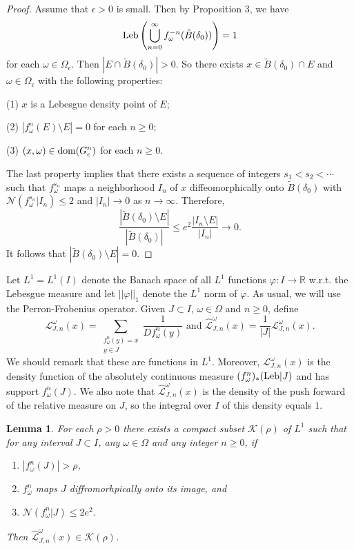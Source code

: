 \documentclass[11pt,oneside]{article}
\theoremstyle{plain}
\newtheorem{lem}{Lemma}[section]
\numberwithin{equation}{section}
\numberwithin{figure}{section}
\numberwithin{table}{section}
\begin{document}
\begin{proof}

Assume that $\epsilon > 0$ is small. Then by Proposition 3, we have
\[
{\rm Leb} \left( \bigcup_{n=0}^{\infty} f_{\omega}^{-n} (\hat B(\delta_0)) \right) =1
\]
for each $\omega \in \Omega_{\epsilon}$. Then $|E \cap \tilde B(\delta_0) | > 0$. So there exists $x \in \tilde B(\delta_0) \cap E$ and $\omega \in \Omega_{\epsilon}$ with the following properties:

(1) $x$ is a Lebesgue density point of $E$;

(2) $|f_{\omega}^n(E) \setminus E| =0$ for each $n \geq 0$;

(3) $(x, \omega) \in {\rm dom} (G_{\epsilon}^n)$ for each $n \geq 0$.

The last property implies that there exists a sequence of integers $s_1 < s_2 < \cdots  $ such that $f_{\omega}^{s_n}$ maps a neighborhood $I_n$ of $x$ diffeomorphically onto $\tilde B(\delta_0)$ with $\mathcal N(f_{\omega}^{s_n} | I_n) \leq 2$ and $|I_n| \to 0$ as $n \to \infty$. Therefore,
\[
\frac{|\tilde B(\delta_0) \setminus E|}{|\tilde B(\delta_0)|} \leq e^2 \frac{|I_n \setminus E|}{|I_n|} \to 0.
\]
It follows that $|\tilde B(\delta_0) \setminus E| = 0$.


\end{proof}
\fi


Let $L^1 = L^1(I)$ denote the Banach space of all $L^1$ functions $\varphi: I \to \mathbb R$ w.r.t. the Lebesgue measure and let $||\varphi||_1$ denote the $L^1$ norm of $\varphi$. As usual, we will use the Perron-Frobenius operator. Given $ J \subset I$, $\omega \in \Omega$ and $n \geq 0$, define
\[
\mathcal L_{J, n}^{\omega} (x) = \sum_{\substack{f_{\omega}^n (y) = x\\ y \in J}} \frac{1}{D f_{\omega}^n (y)} \mbox{ and \ } \hat {\mathcal L}_{J, n}^{\omega}(x) = \frac{1}{|J|}\mathcal L_{J, n}^{\omega} (x) .
\]
We should remark that these are functions in $L^1$. Moreover, $\mathcal L_{J, n}^{\omega} (x) $ is the density function of the absolutely continuous measure $(f_{\omega}^n)_*({\rm Leb}|J) $ and has support $f_{\omega}^n (J)$. We also note that $\hat {\mathcal L}_{J, n}^{\omega}(x) $ is the density of the push forward of the relative measure on $J$, so the integral over $I$ of this density equals $1$.

\begin{lem}

For each $\rho > 0$ there exists a compact subset $\mathcal K(\rho)$ of $L^1$ such that for any interval $J \subset I$, any $\omega \in \Omega$ and any integer $n \geq 0$, if 
\begin{enumerate}
\item[(1)] $|f_{\omega}^n (J)| > \rho$, 

\item[(2)] $f_{\omega}^n$ maps $J$ diffromorhpically onto its image, and

\item[(3)] $\mathcal N(f_{\omega}^n |J) \leq 2e^2$.
\end{enumerate}
Then $\hat {\mathcal L}_{J, n}^{\omega}(x)  \in \mathcal K(\rho)$.

\end{lem}
\end{document}
